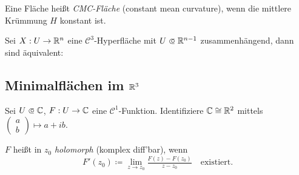 \documentclass{cheat-sheet}
\newcommand{\Cont}{\mathcal{C}} %
\begin{document}
\begin{defn}
  Eine Fläche heißt \emph{CMC-Fläche} (constant mean curvature), wenn die mittlere Krümmung $H$ konstant ist.
\end{defn}

\begin{samepage}

\begin{satz}
  Sei $X : U \to \mathbb{R}^n$ eine $\Cont^3$-Hyperfläche mit $U \opn \R^{n-1}$ zusammenhängend, dann sind äquivalent:
  \begin{itemize}
  \end{itemize}
\end{satz}

\subsection{Minimalflächen im $\mathbb{R}^3$}

\end{samepage}





\begin{situation}
  Sei $U \opn \C$, $F : U \to \mathbb{C}$ eine $\Cont^1$-Funktion. Identifiziere $\mathbb{C} \cong \mathbb{R}^2$ mittels $\left( \begin{smallmatrix} a \\ b \end{smallmatrix} \right) \mapsto a + ib$.
\end{situation}

\begin{defn}
  $F$ heißt in $z_0$ \emph{holomorph} (komplex diff'bar), wenn
  \[ F'(z_0) \coloneqq \lim_{z \to z_0} \tfrac{F(z) - F(z_0)}{z - z_0} \quad \text{existiert.} \]
\end{defn}
\end{document}
